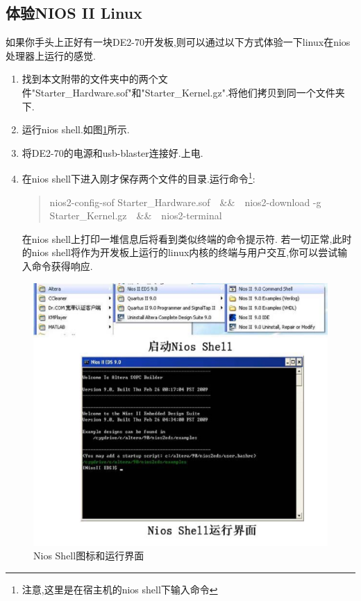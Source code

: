 \documentclass[12pt,a4paper,titlepage]{article}
\begin{document}
\subsection{体验NIOS II Linux}
如果你手头上正好有一块DE2-70开发板,则可以通过以下方式体验一下linux在nios处理器上运行的感觉.
\begin{enumerate}
\item 找到本文附带的文件夹中的两个文件"Starter\_Hardware.sof"和"Starter\_Kernel.gz".将他们拷贝到同一个文件夹下.
\item 运行nios shell.如图\ref{ns}所示.
\item 将DE2-70的电源和usb-blaster连接好.上电.
\item 在nios shell下进入刚才保存两个文件的目录.{运行命令}\footnote{注意,这里是在宿主机的nios shell下输入命令}:
\begin{verse}
nios2-config-sof Starter\_Hardware.sof\ {}\ {}\&\&\ {}\ {}nios2-download -g Starter\_Kernel.gz\ {}\ {}\&\&\ {}\ {}nios2-terminal
\end{verse}
在nios shell上打印一堆信息后将看到类似终端的命令提示符.
若一切正常,此时的nios shell将作为开发板上运行的linux内核的终端与用户交互,你可以尝试输入命令获得响应.
\end{enumerate}
\begin{figure}[!htbp]
\centering
\includegraphics[width=1\textwidth,scale=1]{pic/f_shell_and_icon.eps}
\caption{Nios Shell图标和运行界面\label{ns}}
\end{figure}
\newpage{}
\end{document}
